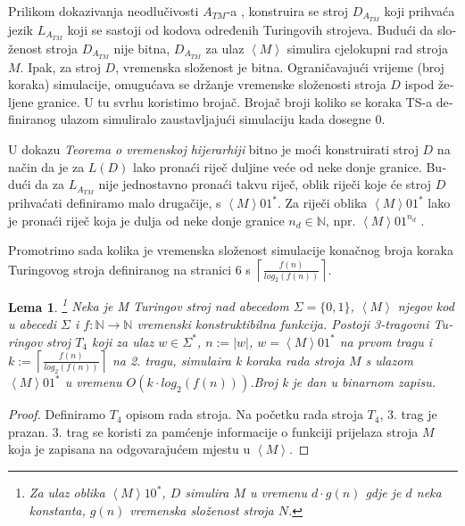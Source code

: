 \documentclass[12pt]{rectors}
\newtheorem{lemma}[theorem]{Lema}
\begin{document}
\begin{otherlanguage}{croatian}
Prilikom dokazivanja neodlučivosti $A_{TM}$-a \cite{sipser2006},
konstruira se stroj $D_{A_{TM}}$ koji prihvaća jezik $L_{A_{TM}}$ koji se sastoji od kodova
određenih Turingovih strojeva. 
Budući da složenost stroja $D_{A_{TM}}$ nije bitna,  $D_{A_{TM}}$ za ulaz $\left < M \right >$ simulira cjelokupni rad stroja $M$. Ipak, za stroj $D$, 
vremenska složenost je bitna. Ograničavajući vrijeme (broj koraka) simulacije,
omugućava se držanje vremenske složenosti stroja $D$ ispod željene granice.
U tu svrhu koristimo brojač. Brojač broji koliko se koraka TS-a definiranog ulazom simuliralo zaustavljajući simulaciju kada dosegne $0$.
 
U dokazu \textit{Teorema o vremenskoj hijerarhiji} bitno je moći konstruirati stroj $D$ na
način da je za $L(D)$ lako pronaći riječ duljine veće od neke donje granice.
Budući da za $L_{A_{TM}}$ nije jednostavno pronaći takvu riječ, oblik riječi koje će stroj $D$ prihvaćati definiramo malo drugačije, s
$\left< M \right>01^*$.
Za riječi oblika $\left< M \right>01^*$ lako je
pronaći riječ koja je dulja od neke donje granice $n_d \in \mathbb{N}$, npr. $\left< M \right>01^{n_d}$ .

Promotrimo sada kolika je vremenska složenost simulacije konačnog broja koraka Turingovog stroja definiranog na stranici 6 s $\left \lceil{\frac{ f(n)}{log_2(f(n))} }\right \rceil$.


\begin{lemma}\label{lemma:t4}\footnote{Za ulaz oblika $\left < M \right >10^*$, $D$ simulira $M$ u vremenu $d \cdot g(n)$ gdje je $d$ neka konstanta, $g(n)$ vremenska složenost stroja $N$.}
Neka je M Turingov stroj nad abecedom $\Sigma = \{0,1\}$, $\left < M \right >$ njegov kod u abecedi $\Sigma $ i $f: \mathbb{N} \to \mathbb{N}$ vremenski konstruktibilna funkcija.
Postoji 3-tragovni Turingov stroj $T_4$ koji za ulaz $w \in \Sigma^*$, $n := \left | w \right |$, $w = \left < M \right >01^*$ na prvom tragu i $k := \left \lceil{ \frac{f(n)}{log_2(f(n))} }\right \rceil $ na 2. tragu, simulaira k koraka rada stroja $M$ s ulazom $\left < M \right >01^*$ u vremenu $O(k \cdot log_2(f(n)))$.\newline Broj k je dan u binarnom zapisu.
\end{lemma}
\begin{proof}

Definiramo $T_4$ opisom rada stroja.
Na početku rada stroja $T_4$, 3. trag je prazan.
3. trag se koristi za pamćenje informacije o funkciji prijelaza stroja $M$ koja je zapisana na odgovarajućem mjestu u $\left < M \right >$.


\end{proof}
\end{otherlanguage}
\end{document}
